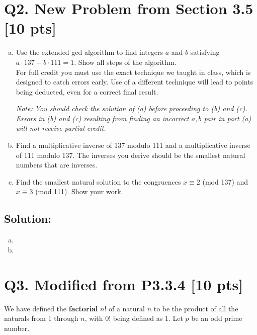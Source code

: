 \documentclass[12pt]{article}
\begin{document}
\newpage

\section*{\textbf{Q2. New Problem from Section 3.5} [10 pts]}
\begin{enumerate}[(a)]
    \item  Use the extended gcd algorithm to find integers $a$ and $b$ satisfying $a \cdot 137 + b \cdot 111 = 1$.  Show all steps of the algorithm.       \\
    For full credit you must use the exact  technique we taught in class, which is designed to catch errors early.
    Use of a different technique will lead to points being deducted, even for a correct final result.
    
     {\em \small Note:  You should check the solution of (a) before proceeding to (b) and (c). Errors in (b) and (c) resulting from finding   an incorrect $a,b$  pair in part (a) will not receive partial credit. }

    \item  Find a multiplicative inverse of 137 modulo 111 and a multiplicative inverse of 111 modulo 137.  The inverses you derive should be the smallest natural numbers that are inverses. 


    \item  Find the smallest natural solution to the congruences $x \equiv 2$ (mod 137) and $x \equiv 3$ (mod 111).  Show your work.

\end{enumerate}


\subsection*{\textbf{Solution:}}
\begin{enumerate}[(a)]
    \item  
    \item
\end{enumerate}


\newpage


\section*{\textbf{Q3. Modified from P3.3.4} [10 pts]}
We have defined the \textbf{factorial} $n!$ of a natural $n$ to be the product of all the naturals from $1$ through $n$, with $0!$ being defined as $1$. Let $p$ be an odd prime number. 
\end{document}
